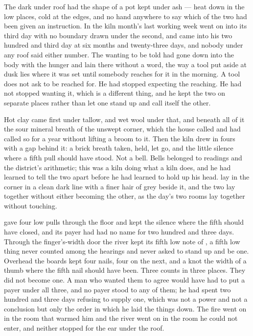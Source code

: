 
The dark under  roof had the shape of a pot kept under ash --- heat down in the low places, cold at the edges, and no hand anywhere to say which of the two had been given an instruction. In  the kiln month's last working week went on into its third day with no boundary drawn under the second, and  came into his two hundred and third day at six months and twenty-three days, and nobody under any roof said either number. The wanting to be told had gone down into the body with the hunger and lain there without a word, the way a tool put aside at dusk lies where it was set until somebody reaches for it in the morning. A tool does not ask to be reached for. He had stopped expecting the reaching. He had not stopped wanting it, which is a different thing, and he kept the two on separate places rather than let one stand up and call itself the other.

Hot clay came first under tallow, and wet wool under that, and beneath all of it the sour mineral breath of the unswept corner, which the house called  and had called so for a year without lifting a broom to it. Then the kiln drew in fours with a gap behind it: a brick breath taken, held, let go, and the little silence where a fifth pull should have stood. Not a bell. Bells belonged to readings and the district's arithmetic; this was a kiln doing what a kiln does, and he had learned to tell the two apart before he had learned to hold up his head.  lay in the corner in a clean dark line with a finer hair of grey beside it, and the two lay together without either becoming the other, as the day's two rooms lay together without touching.

 gave four low pulls through the floor and kept the silence where the fifth should have closed, and its payer had had no name for two hundred and three days. Through the finger's-width door the river kept its fifth low note of , a fifth low thing never counted among the hearings and never asked to stand up and be one. Overhead the boards kept four nails, four on the next, and a knot the width of a thumb where the fifth nail should have been. Three counts in three places. They did not become one. A man who wanted them to agree would have had to put a payer under all three, and no payer stood to any of them; he had spent two hundred and three days refusing to supply one, which was not a power and not a conclusion but only the order in which he laid the things down. The fire went on in the room that warmed him and the river went on in the room he could not enter, and neither stopped for the ear under the roof.

